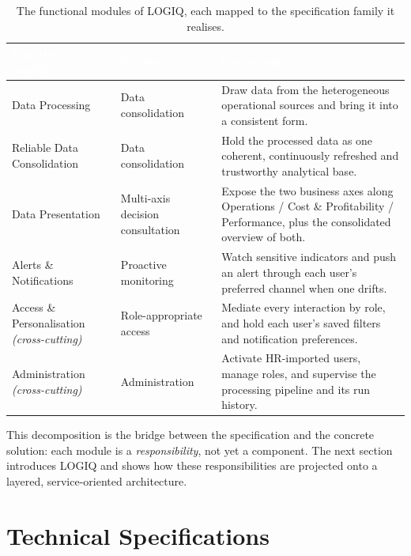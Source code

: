\begin{table}[H]
\centering
\caption{The functional modules of LOGIQ, each mapped to the specification family it realises.}
\label{tab:ch4-funcmodules}
\renewcommand{\arraystretch}{1.35}
\begin{tabularx}{\linewidth}{|>{\raggedright\arraybackslash}p{3.6cm}|>{\raggedright\arraybackslash}p{3.0cm}|>{\raggedright\arraybackslash}X|}
\hline
\rowcolor{tblheader}
\textcolor{white}{\textbf{Functional module}} & \textcolor{white}{\textbf{Realises}} &
\textcolor{white}{\textbf{Conceptual role}} \\
\hline
Data Processing & Data consolidation & Draw data from the heterogeneous operational sources and bring
it into a consistent form. \\
Reliable Data Consolidation & Data consolidation & Hold the processed data as one coherent,
continuously refreshed and trustworthy analytical base. \\
Data Presentation & Multi-axis decision consultation & Expose the two business axes along Operations /
Cost \& Profitability / Performance, plus the consolidated overview of both. \\
Alerts \& Notifications & Proactive monitoring & Watch sensitive indicators and push an alert through
each user's preferred channel when one drifts. \\
Access \& Personalisation \newline \emph{(cross-cutting)} & Role-appropriate access & Mediate every
interaction by role, and hold each user's saved filters and notification preferences. \\
Administration \newline \emph{(cross-cutting)} & Administration & Activate HR-imported users, manage
roles, and supervise the processing pipeline and its run history. \\
\hline
\end{tabularx}
\end{table}

This decomposition is the bridge between the specification and the concrete solution: each module is a
\emph{responsibility}, not yet a component. The next section introduces LOGIQ and shows how these
responsibilities are projected onto a layered, service-oriented architecture.

\section{Technical Specifications}
\label{sec:ch4-techspec}

